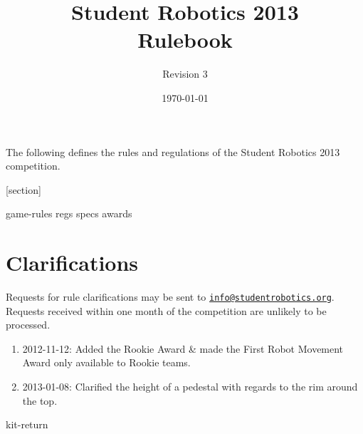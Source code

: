 \documentclass[a4paper, 11pt]{scrartcl}
\title {Student Robotics 2013\\ Rulebook}
\author{Revision 3}
\date{\today}
\begin{document}
\maketitle

\noindent The following defines the rules and regulations of the Student Robotics 2013 competition.

[section]
\newcommand{\rcn}{\stepcounter{rule}\arabic{section}.\arabic{rule}}
\renewcommand{\labelenumi}{\rcn}

 {game-rules}
\newpage
 {regs}
\newpage
 {specs}
\newpage
 {awards}

\renewcommand{\labelenumi}{\rcn}

\section{Clarifications}
Requests for rule clarifications may be sent to \href{mailto:info@studentrobotics.org}{\nolinkurl{info@studentrobotics.org}}.
Requests received within one month of the competition are unlikely to be processed.


\begin{enumerate}
\item 2012-11-12: Added the Rookie Award \& made the First Robot Movement Award only available to Rookie teams.
\item 2013-01-08: Clarified the height of a pedestal with regards to the rim around the top.
\end{enumerate}

\newpage
\appendix
\appendixpage
\addappheadtotoc
 {kit-return}
\end{document}
